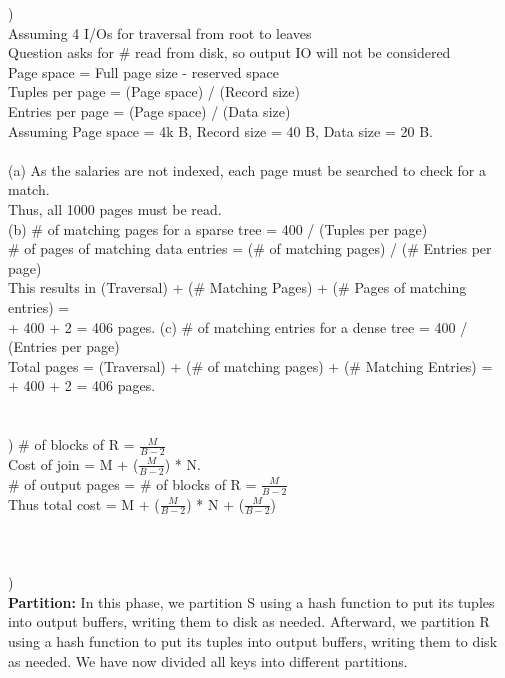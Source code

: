 \documentclass[12pt]{article}
\begin{document}
)\\
\indent Assuming 4 I/Os for traversal from root to leaves\\
\indent Question asks for \# read from disk, so output IO will not be considered\\
\indent Page space = Full page size - reserved space \\
\indent Tuples per page = (Page space) / (Record size) \\
\indent Entries per page = (Page space)  / (Data size) \\
\indent Assuming Page space = 4k B, Record size = 40 B, Data size = 20 B.\\\\
\indent (a) As the salaries are not indexed, each page must be searched to check for a match.\\
\indent \indent Thus, all 1000 pages must be read.\\
\indent (b) \# of matching pages for a sparse tree = 400 / (Tuples per page)\\
\indent \indent \# of pages of matching data entries = (\# of matching pages) / (\# Entries per page)\\
\indent \indent This results in (Traversal) + (\# Matching Pages) + (\# Pages of matching entries) = \\
\indent {} + 400 + 2 = 406 pages.
\indent (c) \# of matching entries for a dense tree = 400 / (Entries per page)\\
\indent \indent Total pages = (Traversal) + (\# of matching pages) + (\# Matching Entries) = \\
\indent {} + 400 + 2 = 406 pages.\\


\hrulefill\\\\


) \# of blocks of R = {\Large $\frac{M}{B-2}$}\\
\indent  Cost of join = M + ({\Large $\frac{M}{B-2}$}) * N.\\
\indent  \# of output pages = \# of blocks of R = {\Large $\frac{M}{B-2}$}\\
\indent  Thus total cost = M + ({\Large $\frac{M}{B-2}$}) * N + ({\Large $\frac{M}{B-2}$})\\\\


\hrulefill\\\\


) \\[.4em]
\textbf{Partition:} In this phase, we partition S using a hash function to put its tuples into output buffers, writing them to disk as needed. Afterward, we partition R using a hash function to put its tuples into output buffers, writing them to disk as needed. We have now divided all keys into different partitions.\\
\end{document}
